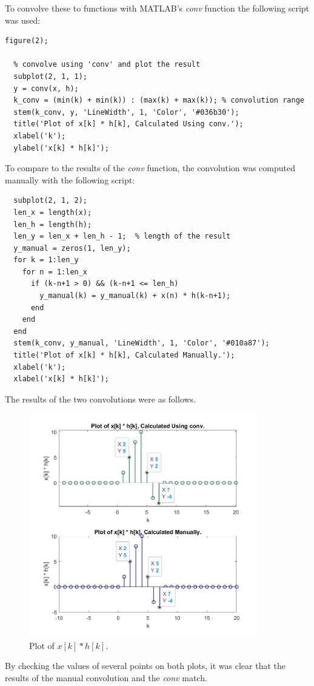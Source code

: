 \documentclass[a4paper, 10pt]{article}
\begin{document}
To convolve these to functions with MATLAB's \textit{conv} function the following script was used:
\begin{lstlisting}[style=Matlab-editor, basicstyle=\small\ttfamily]
  figure(2);
  
  % convolve using 'conv' and plot the result
  subplot(2, 1, 1);
  y = conv(x, h);
  k_conv = (min(k) + min(k)) : (max(k) + max(k)); % convolution range
  stem(k_conv, y, 'LineWidth', 1, 'Color', '#036b30');
  title('Plot of x[k] * h[k], Calculated Using conv.');
  xlabel('k');
  ylabel('x[k] * h[k]'); 
\end{lstlisting}
To compare to the results of the \textit{conv} function, the convolution was computed manually with the following script:
\begin{lstlisting}[style=Matlab-editor, basicstyle=\small\ttfamily]
  % manually compute the convolution and plot the result
  subplot(2, 1, 2);
  len_x = length(x);
  len_h = length(h);
  len_y = len_x + len_h - 1;  % length of the result
  y_manual = zeros(1, len_y);
  for k = 1:len_y
    for n = 1:len_x
      if (k-n+1 > 0) && (k-n+1 <= len_h)
        y_manual(k) = y_manual(k) + x(n) * h(k-n+1);
      end
    end
  end
  stem(k_conv, y_manual, 'LineWidth', 1, 'Color', '#010a87');
  title('Plot of x[k] * h[k], Calculated Manually.');
  xlabel('k');
  xlabel('x[k] * h[k]');  
\end{lstlisting}
The results of the two convolutions were as follows.
\begin{figure}[H]
  \centering
  \includegraphics[width=10cm]{images/q1_result.png}
  \caption{Plot of $x[k] * h[k]$.}
\end{figure}
\noindent By checking the values of several points on both plots, it was clear that the results of the manual convolution
and the \textit{conv} match.
\end{document}
